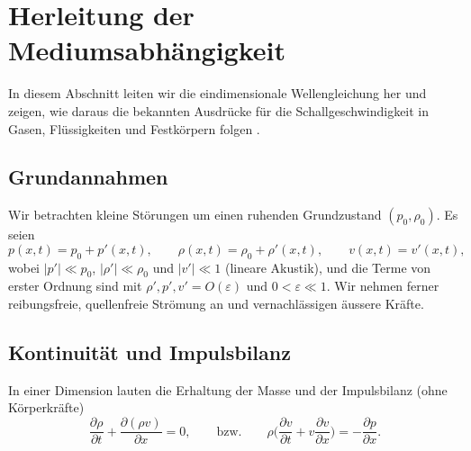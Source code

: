 %

%
%
%
\section{Herleitung der Mediumsabhängigkeit
\label{schall:section:teil1}}

In diesem Abschnitt leiten wir die eindimensionale Wellengleichung her
und zeigen, wie daraus die bekannten Ausdrücke für die Schallgeschwindigkeit
in Gasen, Flüssigkeiten und Festkörpern folgen
\cite{schall:kinsler,schall:landaulifschitz}.

\subsection{Grundannahmen}
Wir betrachten kleine Störungen um einen ruhenden Grundzustand $(p_0,\rho_0)$.
Es seien
\[
    p(x,t)=p_0+p'(x,t),\qquad \rho(x,t)=\rho_0+\rho'(x,t),\qquad v(x,t)=v'(x,t),
\]
wobei $|p'|\ll p_0$, $|\rho'|\ll \rho_0$ und $|v'|\ll 1$ (lineare Akustik),
und die Terme von erster Ordnung sind mit
$\rho',p',v' = O(\varepsilon) \text{ und } 0<\varepsilon\ll 1$.
Wir nehmen ferner reibungsfreie, quellenfreie Strömung an und
vernachlässigen äussere Kräfte.


\subsection{Kontinuität und Impulsbilanz}
%
In einer Dimension lauten die Erhaltung der Masse und der Impulsbilanz
(ohne Körperkräfte)
\begin{equation}
\frac{\partial \rho}{\partial t}+\frac{\partial(\rho v)}{\partial x}=0,
\qquad\text{bzw.}\qquad
\rho\biggl(\frac{\partial v}{\partial t}+v\frac{\partial v}{\partial x}\biggr)=-\frac{\partial p}{\partial x}.
\label{eq:exact-cont-mom}
\end{equation}

